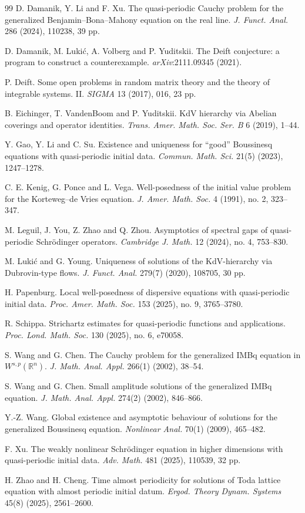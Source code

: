 \documentclass[12pt,reqno,tbtags]{amsart}
\def\R{\mathbb{R}}
\newcommand\1{\mathbbm{1}}
\begin{document}
\begin{thebibliography}{99}
D. Damanik, Y. Li and F. Xu. The quasi-periodic Cauchy problem for the generalized Benjamin--Bona--Mahony equation on the real line. \emph{J. Funct. Anal.} 286 (2024), 110238, 39 pp.

D. Damanik, M. Luki\'{c}, A. Volberg and P. Yuditskii. The Deift conjecture: a program to construct a counterexample. \emph{arXiv}:2111.09345 (2021).

P. Deift. Some open problems in random matrix theory and the theory of integrable systems. II. \emph{SIGMA} 13 (2017), 016, 23 pp.

B. Eichinger, T. VandenBoom and P. Yuditskii. KdV hierarchy via Abelian coverings and operator identities. \emph{Trans. Amer. Math. Soc. Ser. B} 6 (2019), 1--44.

Y. Gao, Y. Li and C. Su. Existence and uniqueness for ``good'' Boussinesq equations with quasi-periodic initial data. \emph{Commun. Math. Sci.} 21(5) (2023), 1247--1278.

C. E. Kenig, G. Ponce and L. Vega. Well-posedness of the initial value problem for the Korteweg--de Vries equation. \emph{J. Amer. Math. Soc.} 4 (1991), no. 2, 323--347.

M. Leguil, J. You, Z. Zhao and Q. Zhou. Asymptotics of spectral gaps of quasi-periodic Schr\"odinger operators. \emph{Cambridge J. Math.} 12 (2024), no. 4, 753--830.

M. Luki\'{c} and G. Young. Uniqueness of solutions of the KdV-hierarchy via Dubrovin-type flows. \emph{J. Funct. Anal.} 279(7) (2020), 108705, 30 pp.

H. Papenburg. Local well-posedness of dispersive equations with quasi-periodic initial data. \emph{Proc. Amer. Math. Soc.} 153 (2025), no. 9, 3765--3780.

R. Schippa. Strichartz estimates for quasi-periodic functions and applications. \emph{Proc. Lond. Math. Soc.} 130 (2025), no. 6, e70058.

S. Wang and G. Chen. The Cauchy problem for the generalized IMBq equation in $W^{s,p}(\R^n)$. \emph{J. Math. Anal. Appl.} 266(1) (2002), 38--54.

S. Wang and G. Chen. Small amplitude solutions of the generalized IMBq equation. \emph{J. Math. Anal. Appl.} 274(2) (2002), 846--866.

Y.-Z. Wang. Global existence and asymptotic behaviour of solutions for the generalized Boussinesq equation. \emph{Nonlinear Anal.} 70(1) (2009), 465--482.

F. Xu. The weakly nonlinear Schr\"{o}dinger equation in higher dimensions with quasi-periodic initial data. \emph{Adv. Math.} 481 (2025), 110539, 32 pp.

H. Zhao and H. Cheng. Time almost periodicity for solutions of Toda lattice equation with almost periodic initial datum. \emph{Ergod. Theory Dynam. Systems} 45(8) (2025), 2561--2600.

\end{thebibliography}
\end{document}
